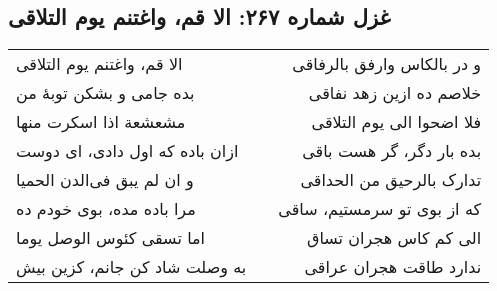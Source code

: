 \begin{center}
\section*{غزل شماره ۲۶۷: الا قم، واغتنم یوم التلاقی}
\label{sec:267}
\begin{longtable}{l p{0.5cm} r}
الا قم، واغتنم یوم التلاقی
&&
و در بالکاس وارفق بالرفاقی
\\
بده جامی و بشکن توبهٔ من
&&
خلاصم ده ازین زهد نفاقی
\\
مشعشعة اذا اسکرت منها
&&
فلا اضحوا الی یوم التلاقی
\\
ازان باده که اول دادی، ای دوست
&&
بده بار دگر، گر هست باقی
\\
و ان لم یبق فی‌الدن الحمیا
&&
تدارک بالرحیق من الحداقی
\\
مرا باده مده، بوی خودم ده
&&
که از بوی تو سرمستیم، ساقی
\\
اما تسقی کئوس الوصل یوما
&&
الی کم کاس هجران تساق
\\
به وصلت شاد کن جانم، کزین بیش
&&
ندارد طاقت هجران عراقی
\\
\end{longtable}
\end{center}
